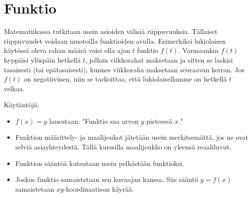 \chapter{Funktio}

Matematiikassa tutkitaan usein asioiden välisiä riippuvuuksia. Tällaiset riippuvuudet voidaan muotoilla funktioiden avulla. Esimerkiksi lukiolaisen käytössä oleva rahan määrä voisi olla ajan $t$ funktio $f(t)$.  Varmaankin $f(t)$ 
hyppäisi ylöspäin hetkellä $t$, jolloin viikkorahat maksetaan ja sitten se laskisi tasaisesti (tai epätasaisesti), kunnes viikkoraha maksetaan seuraavan kerran.  Jos $f(t)$ on negatiivinen, niin se tarkoittaa, että lukiolaisellamme on hetkellä $t$ velkaa.



Käytäntöjä:
\begin{itemize}
\item $f(x) = y$ lausutaan: "Funktio saa arvon $y$ pisteessä $x$."
\item Funktion määrittely- ja maalijoukot jätetään usein merkitsemättä, jos ne ovat selviä asiayhteydestä. Tällä kurssilla maalijoukko on yleensä reaaliluvut.
\item Funktion sääntöä kutsutaan usein pelkästään funktioksi.
\item Joskus funktio samaistetaan sen kuvaajan kanssa.  Siis sääntö $y=f(x)$ samaistetaan $xy$-koordinaatison käyrää.
\end{itemize}

